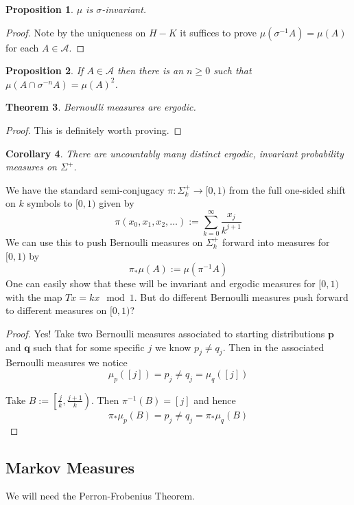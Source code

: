 \documentclass[11pt]{article}
\newcommand{\defeq}{:=}
\newcommand{\mv}[1]{\textbf{#1}}
\newtheorem{prop}{Proposition}[section]
\newtheorem{theorem}[prop]{Theorem}
\newtheorem{cor}[prop]{Corollary}
\begin{document}
\begin{prop}
$\mu$ is $\sigma$-invariant.
\end{prop}

\begin{proof}
Note by the uniqueness on $H-K$ it suffices to prove $\mu(\sigma^{-1}A) = \mu(A)$ for each $A\in\mathcal{A}$.
\end{proof}

\begin{prop}
If $A\in\mathcal{A}$ then there is an $n\geq 0$ such that $\mu(A\cap \sigma^{-n}A)=\mu(A)^2$.
\end{prop}

\begin{theorem}
Bernoulli measures are ergodic.
\end{theorem}

\begin{proof}
This is definitely worth proving.
\end{proof}

\begin{cor}
There are uncountably many distinct ergodic, invariant probability measures on $\Sigma^+$.
\end{cor}

We have the standard semi-conjugacy $\pi: \Sigma_k^+ \to [0, 1)$ from the full one-sided shift on $k$ symbols to $[0, 1)$ given by
\[
	\pi(x_0, x_1, x_2, \dots ) \defeq \sum_{k=0}^{\infty}\frac{x_j}{k^{j+1}}
\]
We can use this to push Bernoulli measures on $\Sigma_k^+$ forward into measures for $[0, 1)$ by
\[
	\pi_\ast \mu(A) \defeq \mu(\pi^{-1}A)
\]
One can easily show that these will be invariant and ergodic measures for $[0, 1)$ with the map $Tx = kx \mod 1$.
But do different Bernoulli measures push forward to different measures on $[0, 1)$?

\begin{proof}
Yes!
Take two Bernoulli measures associated to starting distributions $\mv{p}$ and $\mv{q}$ such that for some specific $j$ we know $p_j \neq q_j$.
Then in the associated Bernoulli measures we notice
\[
\mu_p(\left[ j\right]) = p_j \neq q_j = \mu_q(\left[ j\right])
\]

Take $B\defeq \left[ \frac{j}{k}, \frac{j+1}{k} \right)$.
Then $\pi^{-1}(B) = \left[ j\right]$ and hence
\[
	\pi_\ast \mu_p(B) = p_j \neq q_j = \pi_\ast \mu_q(B)
\]
\end{proof}

\subsection{Markov Measures}
We will need the Perron-Frobenius Theorem.
\end{document}
